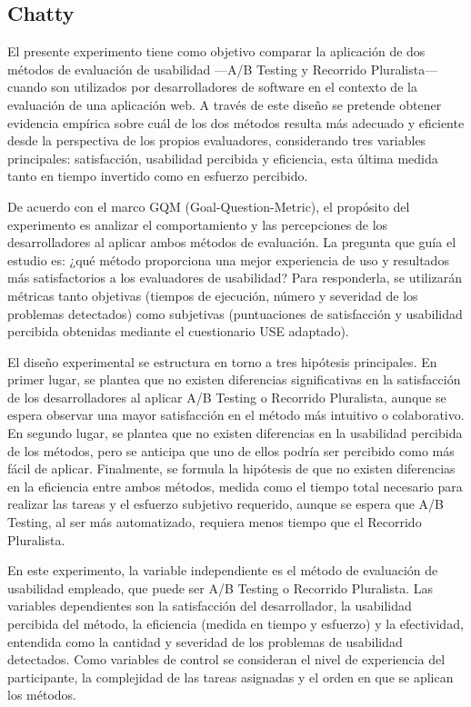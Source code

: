 \documentclass[a4paper,12pt]{report}
\begin{document}
\subsection{Chatty}

El presente experimento tiene como objetivo comparar la aplicación de dos métodos de evaluación de usabilidad —A/B Testing y Recorrido Pluralista— cuando son utilizados por desarrolladores de software en el contexto de la evaluación de una aplicación web. A través de este diseño se pretende obtener evidencia empírica sobre cuál de los dos métodos resulta más adecuado y eficiente desde la perspectiva de los propios evaluadores, considerando tres variables principales: satisfacción, usabilidad percibida y eficiencia, esta última medida tanto en tiempo invertido como en esfuerzo percibido.

De acuerdo con el marco GQM (Goal-Question-Metric), el propósito del experimento es analizar el comportamiento y las percepciones de los desarrolladores al aplicar ambos métodos de evaluación. La pregunta que guía el estudio es: ¿qué método proporciona una mejor experiencia de uso y resultados más satisfactorios a los evaluadores de usabilidad? Para responderla, se utilizarán métricas tanto objetivas (tiempos de ejecución, número y severidad de los problemas detectados) como subjetivas (puntuaciones de satisfacción y usabilidad percibida obtenidas mediante el cuestionario USE adaptado).

El diseño experimental se estructura en torno a tres hipótesis principales. En primer lugar, se plantea que no existen diferencias significativas en la satisfacción de los desarrolladores al aplicar A/B Testing o Recorrido Pluralista, aunque se espera observar una mayor satisfacción en el método más intuitivo o colaborativo. En segundo lugar, se plantea que no existen diferencias en la usabilidad percibida de los métodos, pero se anticipa que uno de ellos podría ser percibido como más fácil de aplicar. Finalmente, se formula la hipótesis de que no existen diferencias en la eficiencia entre ambos métodos, medida como el tiempo total necesario para realizar las tareas y el esfuerzo subjetivo requerido, aunque se espera que A/B Testing, al ser más automatizado, requiera menos tiempo que el Recorrido Pluralista.

En este experimento, la variable independiente es el método de evaluación de usabilidad empleado, que puede ser A/B Testing o Recorrido Pluralista. Las variables dependientes son la satisfacción del desarrollador, la usabilidad percibida del método, la eficiencia (medida en tiempo y esfuerzo) y la efectividad, entendida como la cantidad y severidad de los problemas de usabilidad detectados. Como variables de control se consideran el nivel de experiencia del participante, la complejidad de las tareas asignadas y el orden en que se aplican los métodos.
\end{document}
